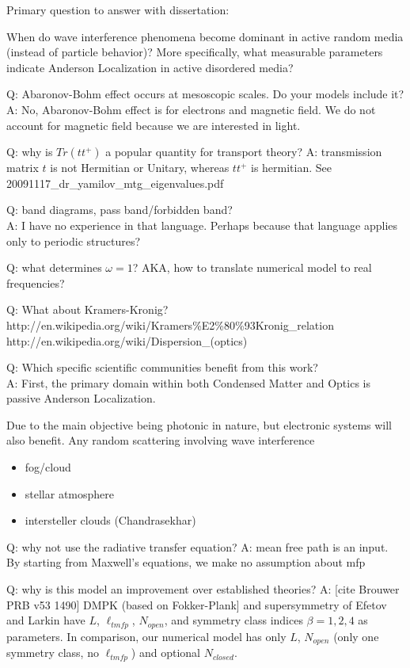\documentclass[12pt]{report} %
\begin{document}
 


Primary question to answer with dissertation:

When do wave interference phenomena become dominant in active random media (instead of particle behavior)? More specifically, what measurable parameters indicate Anderson Localization in active disordered media?

Q: Abaronov-Bohm effect occurs at mesoscopic scales. Do your models include it? \\
A: No, Abaronov-Bohm effect is for electrons and magnetic field. We do not account for magnetic field because we are interested in light.

Q: why is $Tr(tt^+)$ a popular quantity for transport theory?
A: transmission matrix $t$ is not Hermitian or Unitary, whereas $tt^+$ is hermitian. See 20091117\_dr\_yamilov\_mtg\_eigenvalues.pdf

Q: band diagrams, pass band/forbidden band? \\
A: I have no experience in that language. Perhaps because that language applies only to periodic structures?

Q: what determines $\omega=1$? AKA, how to translate numerical model to real frequencies?

Q: What about Kramers-Kronig?
http://en.wikipedia.org/wiki/Kramers\%E2\%80\%93Kronig\_relation
http://en.wikipedia.org/wiki/Dispersion\_(optics)

Q: Which specific scientific communities benefit from this work? \\
A: First, the primary domain within both Condensed Matter and Optics is passive Anderson Localization. 

Due to the main objective being photonic in nature, but electronic systems will also benefit. Any random scattering involving wave interference
\begin{itemize}
\item fog/cloud 
\item stellar atmosphere
\item intersteller clouds (Chandrasekhar)
\end{itemize}

Q: why not use the radiative transfer equation? 
A: mean free path is an input. By starting from Maxwell's equations, we make no assumption about mfp

Q: why is this model an improvement over established theories?
A: [cite Brouwer PRB v53 1490] DMPK (based on Fokker-Plank] and supersymmetry of Efetov and Larkin have $L$, $\ell_{tmfp}$, $N_{open}$, and symmetry class indices $\beta=1,2,4$ as parameters. In comparison, our numerical model has only $L$, $N_{open}$ (only one symmetry class, no $\ell_{tmfp}$) and optional $N_{closed}$.
\end{document}
